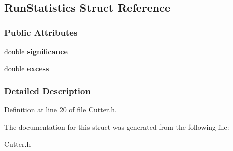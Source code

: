 \hypertarget{structRunStatistics}{
\subsection{RunStatistics Struct Reference}
\label{structRunStatistics}
}
\subsubsection*{Public Attributes}
\begin{DoxyCompactItemize}
\item 
\hypertarget{structRunStatistics_a53b7459d8b2f6448a0fe07bb22ff7e68}{
double {\bfseries significance}}
\label{structRunStatistics_a53b7459d8b2f6448a0fe07bb22ff7e68}

\item 
\hypertarget{structRunStatistics_a891a5cb43e213259d7ab61fc2a383b05}{
double {\bfseries excess}}
\label{structRunStatistics_a891a5cb43e213259d7ab61fc2a383b05}

\end{DoxyCompactItemize}


\subsubsection{Detailed Description}


Definition at line 20 of file Cutter.h.



The documentation for this struct was generated from the following file:\begin{DoxyCompactItemize}
\item 
Cutter.h\end{DoxyCompactItemize}
